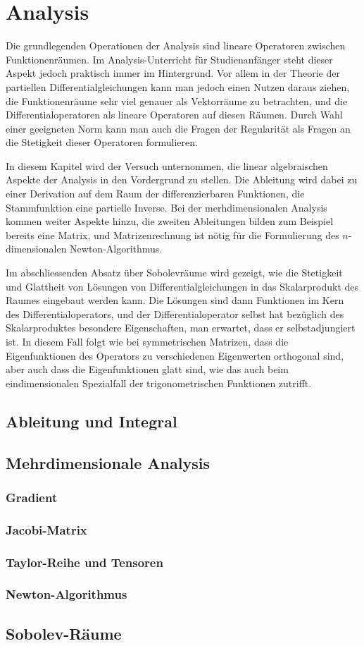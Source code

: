 %
%
%
\chapter{Analysis}
Die grundlegenden Operationen der Analysis sind lineare Operatoren
zwischen Funktionenräumen.
Im Analysis-Unterricht für Studienanfänger steht dieser Aspekt jedoch
praktisch immer im Hintergrund.
Vor allem in der Theorie der partiellen Differentialgleichungen 
kann man jedoch einen Nutzen daraus ziehen, die Funktionenräume
sehr viel genauer als Vektorräume zu betrachten, und die
Differentialoperatoren als lineare Operatoren auf diesen Räumen.
Durch Wahl einer geeigneten Norm kann man auch die Fragen der
Regularität als Fragen an die Stetigkeit dieser Operatoren
formulieren.

In diesem Kapitel wird der Versuch unternommen, die linear algebraischen
Aspekte der Analysis in den Vordergrund zu stellen.
Die Ableitung wird dabei zu einer Derivation auf dem Raum der
differenzierbaren Funktionen, die Stammfunktion eine partielle
Inverse.
Bei der merhdimensionalen Analysis kommen weiter Aspekte hinzu, die
zweiten Ableitungen bilden zum Beispiel bereits eine Matrix,
und Matrizenrechnung ist nötig für die Formulierung des
$n$-dimensionalen Newton-Algorithmus.

Im abschliessenden Absatz über Sobolevräume wird gezeigt, wie
die Stetigkeit und Glattheit von Lösungen von Differentialgleichungen
in das Skalarprodukt des Raumes eingebaut werden kann.
Die Lösungen sind dann Funktionen im Kern des Differentialoperators,
und der Differentialoperator selbst hat bezüglich des Skalarproduktes
besondere Eigenschaften, man erwartet, dass er selbstadjungiert ist.
In diesem Fall folgt wie bei symmetrischen Matrizen, dass die
Eigenfunktionen des Operators zu verschiedenen Eigenwerten orthogonal 
sind, aber auch dass die Eigenfunktionen glatt sind, wie das auch
beim eindimensionalen Spezialfall der trigonometrischen Funktionen
zutrifft.

\section{Ableitung und Integral}

\section{Mehrdimensionale Analysis}
\subsection{Gradient}
\subsection{Jacobi-Matrix}
\subsection{Taylor-Reihe und Tensoren}
\subsection{Newton-Algorithmus}

\section{Sobolev-Räume}

